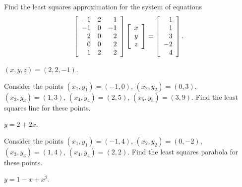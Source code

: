 \documentclass{ximera}
\author{Zack Reed}
\begin{document}

\begin{problem}
  Find the least squares approximation for the system of equations
  \begin{equation*}
    \startmat{rrr}
      -1 & 2 & 1 \\
      -1 & 0 & -1 \\
      2 & 0 & 2 \\
      0 & 0 & 2 \\
      1 & 2 & 2 \\
    \stopmat
    \startmat{c} x \\ y \\ z \stopmat
    =
    \startmat{r} 1 \\ 1 \\ 3 \\ -2 \\ 4 \stopmat.
  \end{equation*}
  \begin{solution}
    $(x,y,z) = (2,2,-1)$.
  \end{solution}
\end{problem}

\begin{problem}
  Consider the points $(x_1,y_1) = (-1,0)$, $(x_2,y_2) = (0,3)$,
  $(x_3,y_3) = (1,3)$, $(x_4,y_4) = (2,5)$, $(x_5,y_5) = (3,9)$.  Find
  the least squares line for these points.
  \begin{solution}
    $y = 2+2x$.
  \end{solution}
\end{problem}

\begin{problem}
  Consider the points $(x_1,y_1) = (-1,4)$, $(x_2,y_2) = (0,-2)$,
  $(x_3,y_3) = (1,4)$, $(x_4,y_4) = (2,2)$.  Find the least squares
  parabola for these points.
  \begin{solution}
    $y = 1-x+x^2$.
  \end{solution}
\end{problem}
\end{document}
